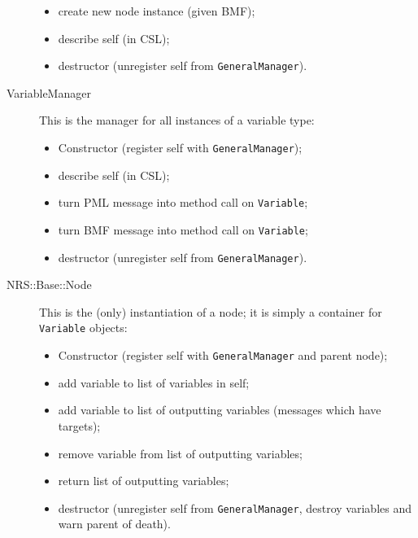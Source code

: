\documentclass[pdftex,a4paper]{article}
\begin{document}
\begin{description}
\begin{itemize}
\item create new node instance (given BMF);

\item describe self (in CSL);

\item destructor (unregister self from {\tt GeneralManager}).

\end{itemize}

\item[VariableManager] This is the manager for all instances of a
  variable type:

\begin{itemize}

\item Constructor (register self with {\tt GeneralManager});

\item describe self (in CSL);

\item turn PML message into method call on {\tt Variable};

\item turn BMF message into method call on {\tt Variable};

\item destructor (unregister self from {\tt GeneralManager}).

\end{itemize}

\item[NRS::Base::Node] This is the (only) instantiation of a node; it
  is simply a container for {\tt Variable} objects:

\begin{itemize}

\item Constructor (register self with {\tt GeneralManager} and parent node);

\item add variable to list of variables in self;

\item add variable to list of outputting variables (messages which
have targets);

\item remove variable from list of outputting variables;

\item return list of outputting variables;

\item destructor (unregister self from {\tt GeneralManager}, destroy
variables and warn parent of death).


\end{itemize}
\end{description}
\end{document}
